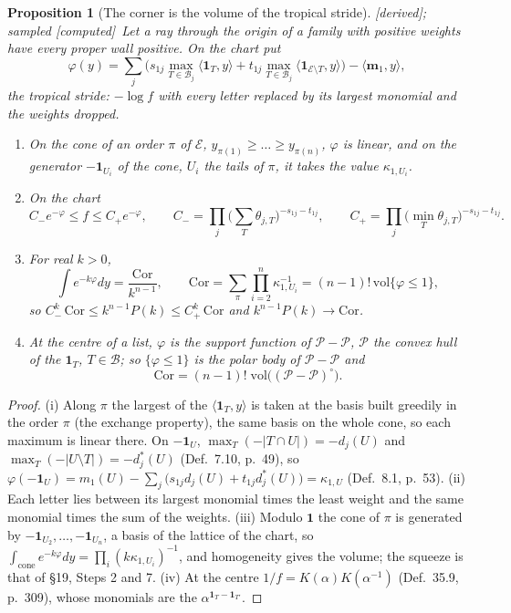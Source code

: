 \documentclass[11pt]{article}
\newcommand{\cE}{\mathcal E}
\newcommand{\cB}{\mathcal B}
\newcommand{\one}{\mathbf 1}
\newcommand{\mvec}{\mathbf m}
\theoremstyle{plain}
\newtheorem{proposition}{Proposition}[section]
\theoremstyle{definition}
\theoremstyle{remark}
\newcommand{\derived}{\textup{[derived]}}
\newcommand{\computed}{\textup{[computed]}}
\begin{document}
\begin{proposition}[The corner is the volume of the tropical stride]\label{a:p:tropcorner}\derived; sampled \computed\
Let a ray through the origin of a family with positive weights have every proper wall positive. On the chart put
\[
\varphi(y)=\sum_j\Big(s_{1j}\max_{T\in\cB_j}\langle\one_T,y\rangle+t_{1j}\max_{T\in\cB_j}\langle\one_{\cE\setminus T},y\rangle\Big)-\langle\mvec_1,y\rangle,
\]
the \emph{tropical stride}: $-\log f$ with every letter replaced by its largest monomial and the weights dropped.
\begin{enumerate}[label=(\roman*)]
\item On the cone of an order $\pi$ of $\cE$, $y_{\pi(1)}\ge\dots\ge y_{\pi(n)}$, $\varphi$ is linear, and on the generator $-\one_{U_i}$ of the cone, $U_i$ the tails of $\pi$, it takes the value $\kappa_{1,U_i}$.
\item On the chart
\[
C_-e^{-\varphi}\le f\le C_+e^{-\varphi},\qquad C_-=\prod_j\Big(\sum_T\theta_{j,T}\Big)^{-s_{1j}-t_{1j}},\qquad C_+=\prod_j\big(\min_T\theta_{j,T}\big)^{-s_{1j}-t_{1j}}.
\]
\item For real $k>0$,
\[
\int e^{-k\varphi}dy=\frac{\mathrm{Cor}}{k^{n-1}},\qquad \mathrm{Cor}=\sum_\pi\prod_{i=2}^n\kappa_{1,U_i}^{-1}=(n-1)!\,\mathrm{vol}\{\varphi\le1\},
\]
so $C_-^k\,\mathrm{Cor}\le k^{n-1}P(k)\le C_+^k\,\mathrm{Cor}$ and $k^{n-1}P(k)\to\mathrm{Cor}$.
\item At the centre of a list, $\varphi$ is the support function of $\mathcal P-\mathcal P$, $\mathcal P$ the convex hull of the $\one_T$, $T\in\cB$; so $\{\varphi\le1\}$ is the polar body of $\mathcal P-\mathcal P$ and
\[
\mathrm{Cor}=(n-1)!\;\mathrm{vol}\big((\mathcal P-\mathcal P)^\circ\big).
\]
\end{enumerate}
\end{proposition}

\begin{proof}
(i) Along $\pi$ the largest of the $\langle\one_T,y\rangle$ is taken at the basis built greedily in the order $\pi$ (the exchange property), the same basis on the whole cone, so each maximum is linear there. On $-\one_U$, $\max_T(-|T\cap U|)=-d_j(U)$ and $\max_T(-|U\setminus T|)=-d^\ast_j(U)$ (Def.~7.10, p.~49), so $\varphi(-\one_U)=m_1(U)-\sum_j\big(s_{1j}d_j(U)+t_{1j}d^\ast_j(U)\big)=\kappa_{1,U}$ (Def.~8.1, p.~53). (ii) Each letter lies between its largest monomial times the least weight and the same monomial times the sum of the weights. (iii) Modulo $\one$ the cone of $\pi$ is generated by $-\one_{U_2},\dots,-\one_{U_n}$, a basis of the lattice of the chart, so $\int_{\text{cone}}e^{-k\varphi}dy=\prod_i(k\kappa_{1,U_i})^{-1}$, and homogeneity gives the volume; the squeeze is that of \S19, Steps 2 and 7. (iv) At the centre $1/f=K(\alpha)K(\alpha^{-1})$ (Def.~35.9, p.~309), whose monomials are the $\alpha^{\one_T-\one_{T'}}$.
\end{proof}
\end{document}
